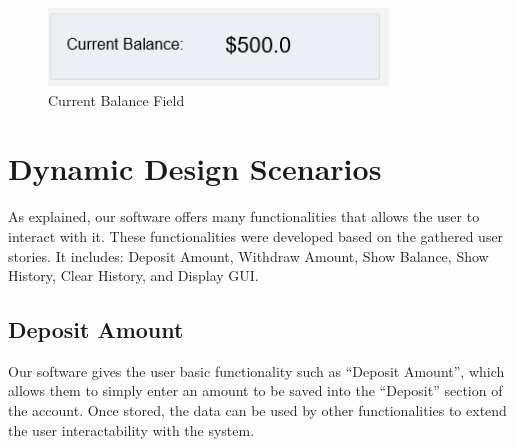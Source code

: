 \documentclass[12pt]{article}
\begin{document}
\begin{figure}[h!]
  \centering
  \includegraphics[]{current_balance.png}
  \caption{Current Balance Field}
\end{figure}


\section{Dynamic Design Scenarios}
As explained, our software offers many functionalities that allows the user to interact with it. These functionalities were developed based on the gathered user stories. It includes: Deposit Amount, Withdraw Amount, Show Balance, Show History, Clear History, and Display GUI. 

\subsection{Deposit Amount}
Our software gives the user basic functionality such as “Deposit Amount”, which allows them to simply enter an amount to be saved into the “Deposit” section of the account. Once stored, the data can be used by other functionalities to extend the user interactability with the system. 
\end{document}
